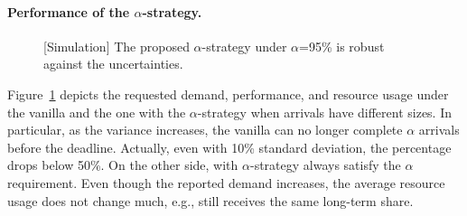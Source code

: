 \paragraph{Performance of the $\alpha$-strategy.}
\begin{figure}[!ht]
	\centering
	\hspace{0.2cm}
	\hspace{0.2cm}
	\caption{[Simulation] The proposed $\alpha$-strategy under $\alpha$=95\% is robust against the uncertainties.}
	\label{fig:probabilistic}
	\vspace{-0.3cm}
\end{figure}

Figure~\ref{fig:probabilistic} depicts the requested demand, performance, and resource usage under the vanilla \name and the one with the $\alpha$-strategy when arrivals have different sizes. In particular, as the variance increases, the vanilla \name can no longer complete $\alpha$ arrivals before the deadline. Actually, even with 10\% standard deviation, the percentage drops below 50\%. On the other side, \name with $\alpha$-strategy always satisfy the $\alpha$ requirement. Even though the reported demand increases, the average resource usage does not change much, e.g., \batchq still receives the same long-term share.




